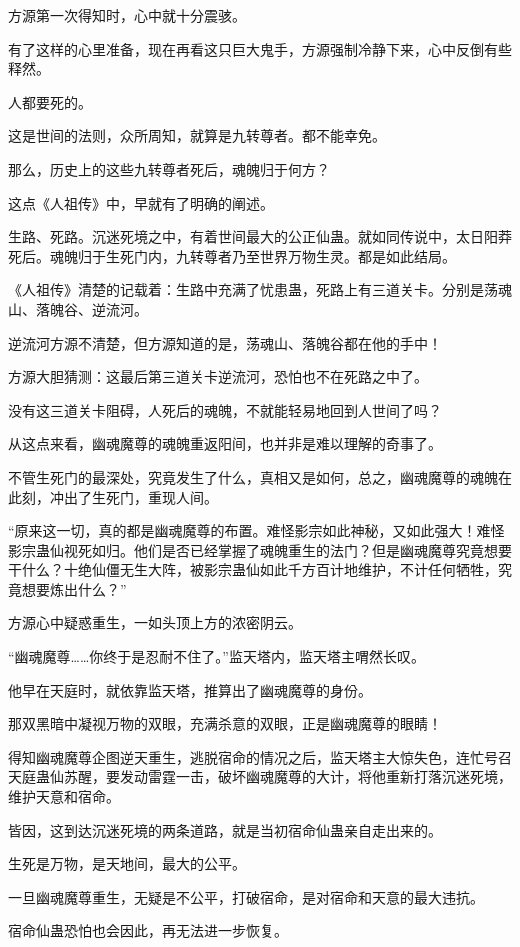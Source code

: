 \begin{this_body}
方源第一次得知时，心中就十分震骇。

有了这样的心里准备，现在再看这只巨大鬼手，方源强制冷静下来，心中反倒有些释然。

人都要死的。

这是世间的法则，众所周知，就算是九转尊者。都不能幸免。

那么，历史上的这些九转尊者死后，魂魄归于何方？

这点《人祖传》中，早就有了明确的阐述。

生路、死路。沉迷死境之中，有着世间最大的公正仙蛊。就如同传说中，太日阳莽死后。魂魄归于生死门内，九转尊者乃至世界万物生灵。都是如此结局。

《人祖传》清楚的记载着：生路中充满了忧患蛊，死路上有三道关卡。分别是荡魂山、落魄谷、逆流河。

逆流河方源不清楚，但方源知道的是，荡魂山、落魄谷都在他的手中！

方源大胆猜测：这最后第三道关卡逆流河，恐怕也不在死路之中了。

没有这三道关卡阻碍，人死后的魂魄，不就能轻易地回到人世间了吗？

从这点来看，幽魂魔尊的魂魄重返阳间，也并非是难以理解的奇事了。

不管生死门的最深处，究竟发生了什么，真相又是如何，总之，幽魂魔尊的魂魄在此刻，冲出了生死门，重现人间。

“原来这一切，真的都是幽魂魔尊的布置。难怪影宗如此神秘，又如此强大！难怪影宗蛊仙视死如归。他们是否已经掌握了魂魄重生的法门？但是幽魂魔尊究竟想要干什么？十绝仙僵无生大阵，被影宗蛊仙如此千方百计地维护，不计任何牺牲，究竟想要炼出什么？”

方源心中疑惑重生，一如头顶上方的浓密阴云。

“幽魂魔尊……你终于是忍耐不住了。”监天塔内，监天塔主喟然长叹。

他早在天庭时，就依靠监天塔，推算出了幽魂魔尊的身份。

那双黑暗中凝视万物的双眼，充满杀意的双眼，正是幽魂魔尊的眼睛！

得知幽魂魔尊企图逆天重生，逃脱宿命的情况之后，监天塔主大惊失色，连忙号召天庭蛊仙苏醒，要发动雷霆一击，破坏幽魂魔尊的大计，将他重新打落沉迷死境，维护天意和宿命。

皆因，这到达沉迷死境的两条道路，就是当初宿命仙蛊亲自走出来的。

生死是万物，是天地间，最大的公平。

一旦幽魂魔尊重生，无疑是不公平，打破宿命，是对宿命和天意的最大违抗。

宿命仙蛊恐怕也会因此，再无法进一步恢复。


\end{this_body}
